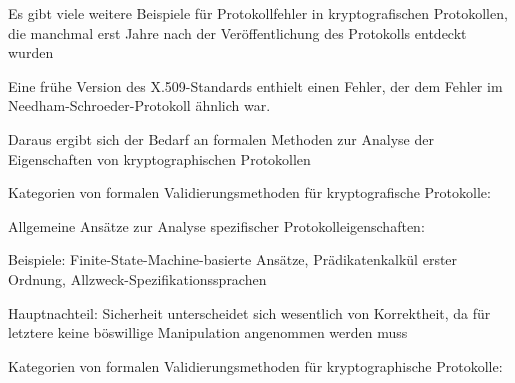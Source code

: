 \documentclass[a4paper]{article}
\begin{document}
\begin{multicols}{3}
\begin{itemize*}
            \begin{itemize*}
                  \item Es gibt viele weitere Beispiele für Protokollfehler in kryptografischen Protokollen, die manchmal erst Jahre nach der Veröffentlichung des Protokolls entdeckt wurden
                  \begin{itemize*} \item Eine frühe Version des X.509-Standards enthielt einen Fehler, der dem Fehler im Needham-Schroeder-Protokoll ähnlich war. \end{itemize*}
                  \item Daraus ergibt sich der Bedarf an formalen Methoden zur Analyse der Eigenschaften von kryptographischen Protokollen
            \end{itemize*}
            \item
            Kategorien von formalen Validierungsmethoden für kryptografische
            Protokolle:

            \begin{itemize*}
                  \item Allgemeine Ansätze zur Analyse spezifischer Protokolleigenschaften:
                  \begin{itemize*} \item Beispiele: Finite-State-Machine-basierte Ansätze, Prädikatenkalkül erster Ordnung, Allzweck-Spezifikationssprachen \item Hauptnachteil: Sicherheit unterscheidet sich wesentlich von Korrektheit, da für letztere keine böswillige Manipulation angenommen werden muss \end{itemize*}
            \end{itemize*}
            \item
            Kategorien von formalen Validierungsmethoden für kryptographische
            Protokolle:


\end{itemize*}
\end{multicols}
\end{document}
